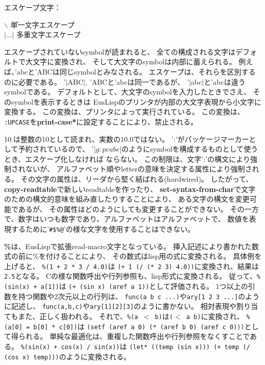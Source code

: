 エスケープ文字：

\begin{tabbing}
{\bf $\backslash$} \hspace{10mm} \=  単一文字エスケープ\\
{\bf $|...|$} \>  多重文字エスケープ\\
\end{tabbing}

エスケープされていないsymbolが読まれると、
全ての構成される文字はデフォルトで大文字に変換され、
そして大文字のsymbolは内部に蓄えられる。
例えば、'abcと'ABCは同じsymbolとみなされる。
エスケープは、それらを区別するのに必要である。
'$|$ABC$|$, 'ABCと'abcは同一であるが、
'$|$abc$|$と'abcは違うsymbolである。
デフォルトとして、大文字のsymbolを入力したときでさえ、
そのsymbolを表示するときは
EusLispのプリンタが内部の大文字表現から小文字に変換する。
この変換は、プリンタによって実行されている。
この変換は、
{\tt :UPCASE}を{\bf *print-case*}に設定することにより、禁止される。

10.は整数の10として読まれ、実数の10.0ではない。
':'がパッケージマーカーとして予約されているので、
'$|g:pcube|$のようにsymbolを構成するものとして使うとき、エスケープ化しなければ
ならない。
この制限は、文字':'の構文により強制されないが、
アルファベット順やletterの意味を決定する属性により強制される。
その文字の属性は、リーダから堅く結ばれる(hardwired)。
したがって、{\bf copy-readtable}で新しいreadtableを作ったり、
{\bf set-syntax-from-char}で文字のための構文的意味を組み直したりすることにより、
ある文字の構文を変更可能であるが、
その属性はどのようにしても変更することができない。
その一方で、数字はいつも数字であり、アルファベットはアルファベットで、
数値を表現するために'{\tt \#\$\%@}'の様な文字を使用することはできない。

{\bf \%}は、EusLispで拡張read-macro文字となっている。
挿入記述により書かれた数式の前に\%を付けることにより、
その数式はlisp用の式に変換される。
具体例を上げると、
{\tt \%(1 + 2 * 3 / 4.0)}は
{\tt (+ 1 (/ (* 2 3) 4.0))}に変換され、結果は{\tt 2.5}となる。
Cの様な関数呼出や行列参照も、lisp形式に変換される。
従って、{\tt \%(sin(x) + a[1])}は
{\tt  (+ (sin x) (aref a 1))}として評価される。
1つ以上の引数を持つ関数や2次元以上の行列は、
{\tt func(a b c ...)}や{\tt ary[1 2 3 ...]}のように記述し、
{\tt func(a,b,c)}や{\tt ary[1][2][3]}のように書かない。
相対表現や割り当てもまた、正しく扱われる。
それで、{\tt \%(a $<$ b)}は{\tt ($<$ a b)}に変換され、
{\tt \%(a[0] = b[0] * c[0])}は 
{\tt (setf (aref a 0) (* (aref b 0) (aref c 0)))}として得られる。
単純な最適化は、重複した関数呼出や行列参照をなくすことである。
{\tt \%(sin(x) + cos(x) / sin(x))}は
{\tt (let* ((temp (sin x))) (+ temp (/ (cos x) temp)))}のように変換される。

